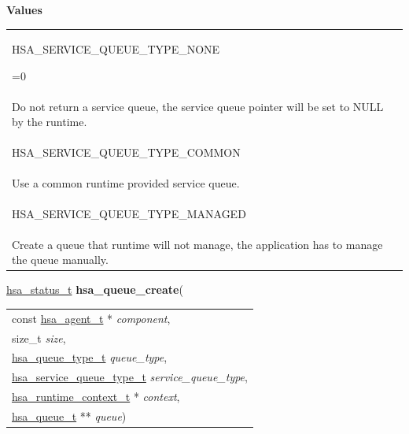 \documentclass[final]{book}
\newcommand{\hsaarg}[1]{\textit{#1}}
\newcommand{\reftyp}[1]{#1}
\newcommand{\refenu}[1]{\reftyp{#1}}
\begin{document}
\begin{appendices}
\noindent\textbf{Values}\\[-5mm]
\begin{longtable}{@{\hspace{2em}}p{\linewidth-2em}}
\hspace{-2em}\hypertarget{group--queue-1gga78cf6075d505c83bc59ed38ee8c39e96a54b03dee99c57d97449072661c532081}{\refenu{HSA_SERVICE_QUEUE_TYPE_NONE}} =0\\Do not return a service queue, the service queue pointer will be set to NULL by the runtime.\\[2mm]
\hspace{-2em}\hypertarget{group--queue-1gga78cf6075d505c83bc59ed38ee8c39e96a9692eb0a0d64c484c4a74a205e521108}{\refenu{HSA_SERVICE_QUEUE_TYPE_COMMON}} \\Use a common runtime provided service queue.\\[2mm]
\hspace{-2em}\hypertarget{group--queue-1gga78cf6075d505c83bc59ed38ee8c39e96ae91e1f408f228ce590d086c03166e11b}{\refenu{HSA_SERVICE_QUEUE_TYPE_MANAGED}} \\Create a queue that runtime will not manage, the application has to manage the queue manually.
\end{longtable}

\noindent\begin{tcolorbox}[breakable,nobeforeafter,colframe=white,colback=lightgray,left=0mm]
\hyperlink{group--status-1gad755322e7ff95456520e8abdbe90d225}{hsa_status_t} \hypertarget{group--queue-1ga4f8f6f017eba2abbb557063b6b08edd0}{\textbf{hsa_queue_create}}(
\vspace{-3.5mm}\begin{longtable}{@{}p{\textwidth}}
\hspace{1.7em}const \hyperlink{group--topology-1gab8db3fb886332a24acac08ec361e1d86}{hsa_agent_t} * \hsaarg{component},\\
\hspace{1.7em}size_t \hsaarg{size},\\
\hspace{1.7em}\hyperlink{group--queue-1gaf1939f228a41fa6ee50cffd4de03b561}{hsa_queue_type_t} \hsaarg{queue_type},\\
\hspace{1.7em}\hyperlink{group--queue-1ga78cf6075d505c83bc59ed38ee8c39e96}{hsa_service_queue_type_t} \hsaarg{service_queue_type},\\
\hspace{1.7em}\hyperlink{group--context-1ga0296b674c03f1a65fa8ef91e2f0ad44d}{hsa_runtime_context_t} * \hsaarg{context},\\
\hspace{1.7em}\hyperlink{group--queue-1gacbb2835331f18aee30ee441f07b3fc5a}{hsa_queue_t} ** \hsaarg{queue})\end{longtable}


\end{tcolorbox}
\end{appendices}
\end{document}
